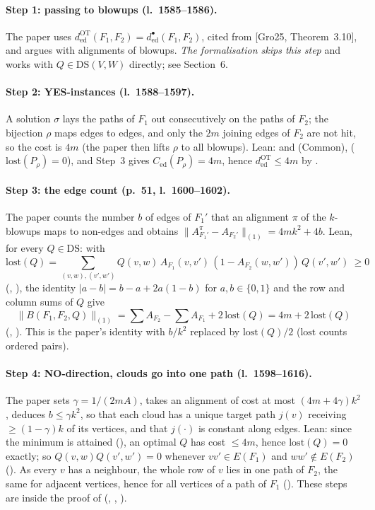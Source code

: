 \paragraph{Step 1: passing to blowups (l.~1585--1586).} The paper uses
$d^{\mathrm{OT}}_{\mathrm{ed}}(F_1,F_2)=d^{\bullet}_{\mathrm{ed}}(F_1,F_2)$, cited from [Gro25, Theorem~3.10],
and argues with alignments of blowups. \emph{The formalisation skips this step} and works with
$Q\in\mathrm{DS}(V,W)$ directly; see Section~6.

\paragraph{Step 2: YES-instances (l.~1588--1597).} A solution $\sigma$ lays the paths of $F_1$ out
consecutively on the paths of $F_2$; the bijection $\rho$ maps edges to edges, and only the $2m$ joining
edges of $F_2$ are not hit, so the cost is $4m$ (the paper then lifts $\rho$ to all blowups).
Lean:  and  (Common), 
($\mathrm{lost}(P_\rho)=0$), and Step~3 gives $C_{\mathrm{ed}}(P_\rho)=4m$, hence
$d^{\mathrm{OT}}_{\mathrm{ed}}\le4m$ by .

\paragraph{Step 3: the edge count (p.~51, l.~1600--1602).} The paper counts the number $b$ of edges of $F_1'$ that
an alignment $\pi$ of the $k$-blowups maps to non-edges and obtains
$\|A^{\pi}_{F_1'}-A_{F_2'}\|_{(1)}=4mk^2+4b$. Lean, for every $Q\in\mathrm{DS}$: with
\[ \mathrm{lost}(Q)=\sum_{(v,w),(v',w')}Q(v,w)\,A_{F_1}(v,v')\,(1-A_{F_2}(w,w'))\,Q(v',w')\ \ge0 \]
(, ), the identity $|a-b|=b-a+2a(1-b)$ for $a,b\in\{0,1\}$ and the row and
column sums of $Q$ give
\[ \|B(F_1,F_2,Q)\|_{(1)}=\textstyle\sum A_{F_2}-\sum A_{F_1}+2\,\mathrm{lost}(Q)=4m+2\,\mathrm{lost}(Q) \]
(, ). This is the paper's identity with
$b/k^2$ replaced by $\mathrm{lost}(Q)/2$ ($\mathrm{lost}$ counts ordered pairs).

\paragraph{Step 4: NO-direction, clouds go into one path (l.~1598--1616).} The paper sets
$\gamma=1/(2mA)$, takes an alignment of cost at most $(4m+4\gamma)k^2$, deduces $b\le\gamma k^2$, so that
each cloud has a unique target path $j(v)$ receiving $\ge(1-\gamma)k$ of its vertices, and that $j(\cdot)$ is
constant along edges. Lean: since the minimum is attained (), an optimal $Q$ has
cost $\le4m$, hence $\mathrm{lost}(Q)=0$ exactly; so $Q(v,w)Q(v',w')=0$ whenever $vv'\in E(F_1)$ and
$ww'\notin E(F_2)$ (). As every $v$ has a neighbour, the whole row
of $v$ lies in one path of $F_2$, the same for adjacent vertices, hence for all vertices of a path of $F_1$
(). These steps are inside the proof of 
(, , ).


